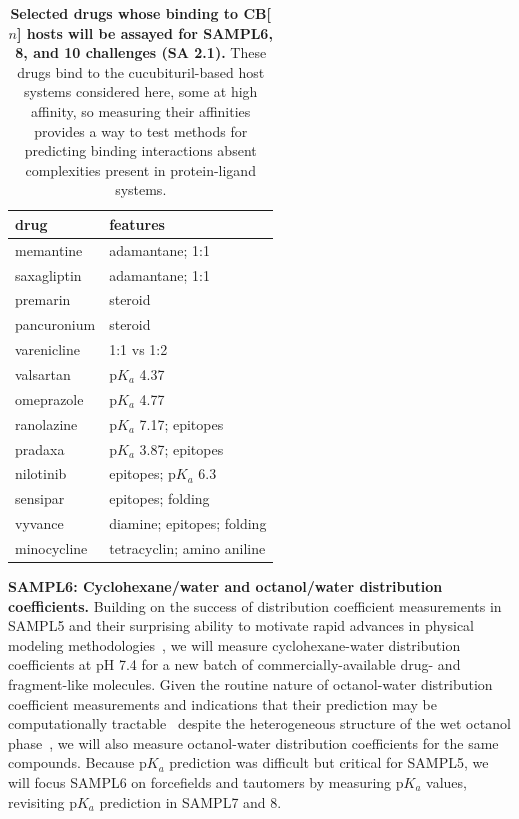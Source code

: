 \documentclass[11pt]{article}
\begin{document}
\begin{table}
\vspace{-0.2in}
\footnotesize
\begin{tabular}{l | l}
{\bf drug} & {\bf features} \\
\hline
memantine & adamantane; 1:1 \\
saxagliptin & adamantane; 1:1 \\
premarin & steroid \\
pancuronium & steroid\\
varenicline & 1:1 vs 1:2 \\
valsartan & p$K_a$ 4.37 \\ 
omeprazole & p$K_a$ 4.77 \\
ranolazine & p$K_a$ 7.17; epitopes \\
pradaxa & p$K_a$ 3.87; epitopes \\
nilotinib & epitopes; p$K_a$ 6.3 \\
sensipar & epitopes; folding \\
vyvance & diamine; epitopes; folding \\
minocycline & tetracyclin; amino aniline \\
\end{tabular}
\caption{\textbf{\label{table:CB} Selected drugs whose binding to CB[$n$] hosts will be assayed for SAMPL6, 8, and 10 challenges (SA 2.1).} These drugs bind to the cucubituril-based host systems considered here, some at high affinity, so measuring their affinities provides a way to test methods for predicting binding interactions absent complexities present in protein-ligand systems.
}
\vspace{-0.1in}
\end{table}

\textbf{SAMPL6: Cyclohexane/water and octanol/water distribution coefficients.}
Building on the success of distribution coefficient measurements in SAMPL5 and their surprising ability to motivate rapid advances in physical modeling methodologies~\cite{bannan_blind_2016}, we will measure cyclohexane-water distribution coefficients at pH 7.4 for a new batch of commercially-available drug- and fragment-like molecules.
Given the routine nature of octanol-water distribution coefficient measurements and indications that their prediction may be computationally tractable~\cite{Bhatnagar:2013:PhysicalChemistryChemicalPhysics, bannan_calculating_2016} despite the heterogeneous structure of the wet octanol phase~\cite{Kollman:1996:AccountsofChemicalResearch}, we will also measure octanol-water distribution coefficients for the same compounds.
Because p$K_a$ prediction was difficult but critical for SAMPL5, we will focus SAMPL6 on forcefields and tautomers by measuring p$K_a$ values, revisiting p$K_a$ prediction in SAMPL7 and 8.
\end{document}
